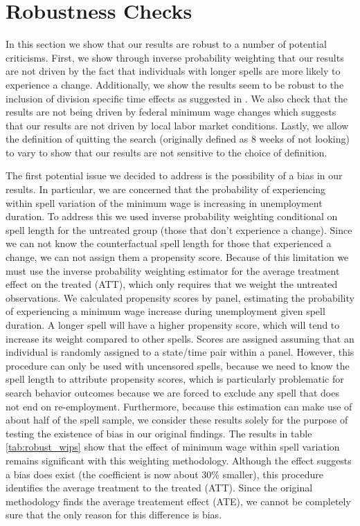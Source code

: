 \documentclass{article}
\begin{document}
\section{Robustness Checks}
In this section we show that our results are robust to a number of potential criticisms. First, we show through inverse probability weighting that our results are not driven by the fact that individuals with longer spells are more likely to experience a change. Additionally, we show the results seem to be robust to the inclusion of division specific time effects as suggested in \cite{allegretto2011minimum}. We also check that the results are not being driven by federal minimum wage changes which suggests that our results are not driven by local labor market conditions. Lastly, we allow the definition of quitting the search (originally defined as 8 weeks of not looking) to vary to show that our results are not sensitive to the choice of definition.

The first potential issue we decided to address is the possibility of a bias in our results. In particular, we are concerned that the probability of experiencing within spell variation of the minimum wage is increasing in unemployment duration. To address this we used inverse probability weighting conditional on spell length for the untreated group (those that don't experience a change). Since we can not know the counterfactual spell length for those that experienced a change, we can not assign them a propensity score. Because of this limitation we must use the inverse probability weighting estimator for the average treatment effect on the treated (ATT), which only requires that we weight the untreated observations. We calculated propensity scores by panel, estimating the probability of experiencing a minimum wage increase during unemployment given spell duration. A longer spell will have a higher propensity score, which will tend to increase its weight compared to other spells. Scores are assigned assuming that an individual is randomly assigned to a state/time pair within a panel. However, this procedure can only be used with uncensored spells, because we need to know the spell length to attribute propensity scores, which is particularly problematic for search behavior outcomes because we are forced to exclude any spell that does not end on re-employment. Furthermore, because this estimation can make use of about half of the spell sample, we consider these results solely for the purpose of testing the existence of bias in our original findings. The results in table \ref{tab:robust_wips} show that the effect of minimum wage within spell variation remains significant with this weighting methodology. Although the effect suggests a bias does exist (the coefficient is now about 30\% smaller), this procedure identifies the average treatment to the treated (ATT). Since the original methodology finds the average treatement effect (ATE), we cannot be completely sure that the only reason for this difference is bias.
\end{document}
